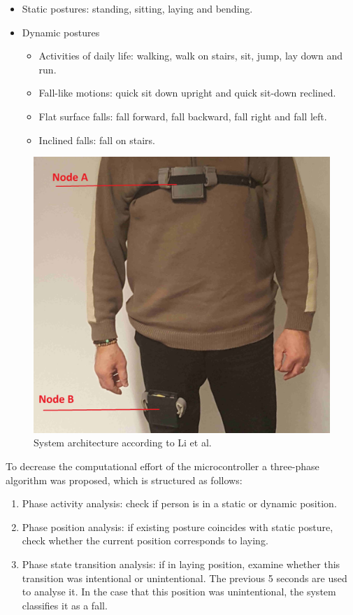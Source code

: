 \documentclass[review]{elsarticle}
\begin{document}
\begin{itemize}
 \item Static postures: standing, sitting, laying and bending.
 \item Dynamic postures
 \begin{itemize}
  \item Activities of daily life: walking, walk on stairs, sit, jump, lay down and run.
  \item Fall-like motions: quick sit down upright and quick sit-down reclined.
  \item Flat surface falls: fall forward, fall backward, fall right and fall left.
  \item Inclined falls: fall on stairs.
 \end{itemize}
\end{itemize}

\begin{figure}[!ht]
  \centering
  \includegraphics[scale=0.15]{img/BasePrototype.png}
  \caption[System architecture]{System architecture according to Li et al.~\cite{Li2009}}
  \label{fig:simulation}
\end{figure}

To decrease the computational effort of the microcontroller a three-phase algorithm was proposed, which is structured 
as follows:

\begin{enumerate}
 \item Phase activity analysis: check if person is in a static or dynamic position.
 \item Phase position analysis: if existing posture coincides with static posture, check whether the current position corresponds to laying.
 \item Phase state transition analysis: if in laying position, examine whether this transition was intentional or unintentional. The previous 5 
 seconds are used to analyse it. In the case that this position was unintentional, the system classifies it as a fall. 
\end{enumerate}
\end{document}
